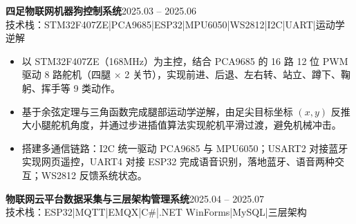 \documentclass[10pt,a4paper]{article}
\newcommand{\projectblock}[3]{%
    {\bfseries\color{darktext}#1}\hfill{\color{graytext}#2}\\%
    {\small\color{graytext}#3}%
    \vspace{0.2em}%
}
\begin{document}
\projectblock{四足物联网机器狗控制系统}{2025.03 -- 2025.06}{技术栈：STM32F407ZE\hspace{0.3em}|\hspace{0.3em}PCA9685\hspace{0.3em}|\hspace{0.3em}ESP32\hspace{0.3em}|\hspace{0.3em}MPU6050\hspace{0.3em}|\hspace{0.3em}WS2812\hspace{0.3em}|\hspace{0.3em}I2C\hspace{0.3em}|\hspace{0.3em}UART\hspace{0.3em}|\hspace{0.3em}运动学逆解}

\begin{itemize}[leftmargin=1.5em, itemsep=2pt, parsep=0pt, topsep=2pt]
    \item 以 STM32F407ZE（168MHz）为主控，结合 PCA9685 的 16 路 12 位 PWM 驱动 8 路舵机（四腿 $\times$ 2 关节），实现前进、后退、左右转、站立、蹲下、鞠躬、挥手等 9 类动作。
    \item 基于余弦定理与三角函数完成腿部运动学逆解，由足尖目标坐标 $(x, y)$ 反推大小腿舵机角度，并通过步进插值算法实现舵机平滑过渡，避免机械冲击。
    \item 搭建多通信链路：I2C 统一驱动 PCA9685 与 MPU6050；USART2 对接蓝牙实现网页遥控，UART4 对接 ESP32 完成语音识别，落地蓝牙、语音两种交互；WS2812 反馈系统状态。
\end{itemize}

\vspace{0.15em}

\projectblock{物联网云平台数据采集与三层架构管理系统}{2025.04 -- 2025.07}{技术栈：ESP32\hspace{0.3em}|\hspace{0.3em}MQTT\hspace{0.3em}|\hspace{0.3em}EMQX\hspace{0.3em}|\hspace{0.3em}C\#\hspace{0.3em}|\hspace{0.3em}.NET WinForms\hspace{0.3em}|\hspace{0.3em}MySQL\hspace{0.3em}|\hspace{0.3em}三层架构}
\end{document}
